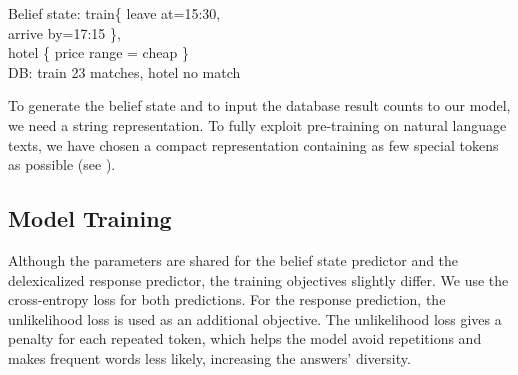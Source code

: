 \documentclass[11pt,a4paper]{article}
\newcommand{\augpt}[0]{AuGPT\xspace}
\begin{document}
\begin{example}
\begin{mdframed}[style=ExampleFrame]
Belief state: train\{ leave at=15:30, \\ 
\-\hspace{20pt}arrive by=17:15 \}, \\
\-\hspace{10pt}hotel \{ price range = cheap \} \\
DB: train 23 matches, hotel no match
\end{mdframed}
\caption{String format for \augpt's belief state and database result count\label{ex:augpt_format}.}
\end{example}

To generate the belief state and to input the database result counts to our model, we need a string representation. To fully exploit pre-training on natural language texts, we have chosen a compact representation containing as few special tokens as possible (see ).


\subsection{Model Training}
\label{sec:model-traning}
Although the parameters are shared for the belief state predictor and the delexicalized response predictor, the training objectives slightly differ. We use the cross-entropy loss for both predictions. For the response prediction, the unlikelihood loss \cite{welleck2019,li_dont_2020} is used as an additional objective. The unlikelihood loss gives a penalty for each repeated token, which helps the model avoid repetitions and makes frequent words less likely, increasing the answers' diversity.
\end{document}

